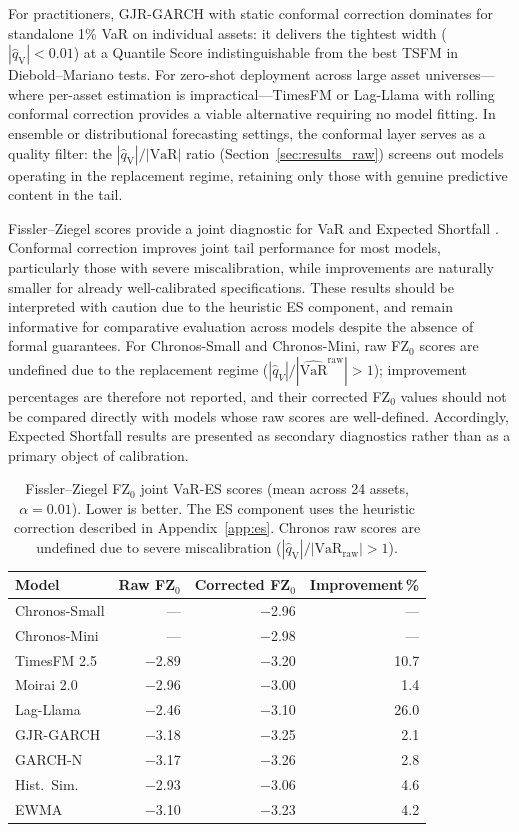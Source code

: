 \documentclass[preprint,11pt,authoryear]{elsarticle}
\newcommand{\VaR}{\mathrm{VaR}}
\newcommand{\1}{\boldsymbol{1}}
\newcommand{\qV}{\hat{q}_{\scriptscriptstyle\mathrm{V}}}
\begin{document}
	For practitioners, GJR-GARCH with static conformal correction
	dominates for standalone 1\% VaR on individual assets: it
	delivers the tightest width ($|\qV| < 0.01$) at a Quantile
	Score indistinguishable from the best TSFM in Diebold--Mariano
	tests. For zero-shot deployment across large asset
	universes---where per-asset estimation is impractical---TimesFM
	or Lag-Llama with rolling conformal correction provides a viable
	alternative requiring no model fitting. In ensemble or
	distributional forecasting settings, the conformal layer serves
	as a quality filter: the $|\qV|/|\VaR|$ ratio
	(Section~\ref{sec:results_raw}) screens out models operating in
	the replacement regime, retaining only those with genuine
	predictive content in the tail.

	Fissler--Ziegel scores provide a joint diagnostic for VaR and Expected Shortfall \citep{fissler2016higher}. Conformal correction improves joint tail performance for most models, particularly those with severe miscalibration, while improvements are naturally smaller for already well-calibrated specifications. These results should be interpreted with caution due to the heuristic ES component, and remain informative for comparative evaluation across models despite the absence of formal guarantees.
	For Chronos-Small and Chronos-Mini, raw FZ$_0$ scores are undefined due to the replacement regime ($|\hat{q}_V|/|\widehat{\VaR}^{\mathrm{raw}}| > 1$); improvement percentages are therefore not reported, and their corrected FZ$_0$ values should not be compared directly with models whose raw scores are well-defined.
	Accordingly, Expected Shortfall results are presented as secondary diagnostics rather than as a primary object of calibration.

	\begin{table}[H]
		\centering
		\caption{Fissler--Ziegel FZ$_0$ joint VaR-ES scores (mean across 24 assets, $\alpha = 0.01$). Lower is better. The ES component uses the heuristic correction described in Appendix~\ref{app:es}. Chronos raw scores are undefined due to severe miscalibration ($|\qV|/|\mathrm{VaR}_{\mathrm{raw}}| > 1$).}
		\label{tab:fz_scores}
		\footnotesize
		\begin{tabular}{@{}lrrr@{}}
			\toprule
			Model & Raw FZ$_0$ & Corrected FZ$_0$ & Improvement\,\% \\
			\midrule
			Chronos-Small      & ---   & $-$2.96 & ---  \\
			Chronos-Mini       & ---   & $-$2.98 & ---  \\
			TimesFM 2.5        & $-$2.89 & $-$3.20 & 10.7 \\
			Moirai 2.0         & $-$2.96 & $-$3.00 &  1.4 \\
			Lag-Llama          & $-$2.46 & $-$3.10 & 26.0 \\
			GJR-GARCH          & $-$3.18 & $-$3.25 &  2.1 \\
			GARCH-N            & $-$3.17 & $-$3.26 &  2.8 \\
			Hist.\ Sim.        & $-$2.93 & $-$3.06 &  4.6 \\
			EWMA               & $-$3.10 & $-$3.23 &  4.2 \\
			\bottomrule
		\end{tabular}
	\end{table}
\end{document}
